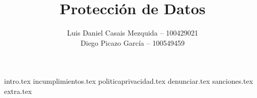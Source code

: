 \documentclass[es]{uc3mreport}
\author{
    Luis Daniel Casais Mezquida -- 100429021\\
    Diego Picazo García -- 100549459
}
\title{Protección de Datos}
\begin{document}


    \begin{report}

        {intro.tex}
        {incumplimientos.tex}
        {politicaprivacidad.tex}
        {denunciar.tex}
        {sanciones.tex}
        {extra.tex}

    \end{report}

    \label{bibliography}
    \printbibliography[title={Referencias}]
\end{document}

